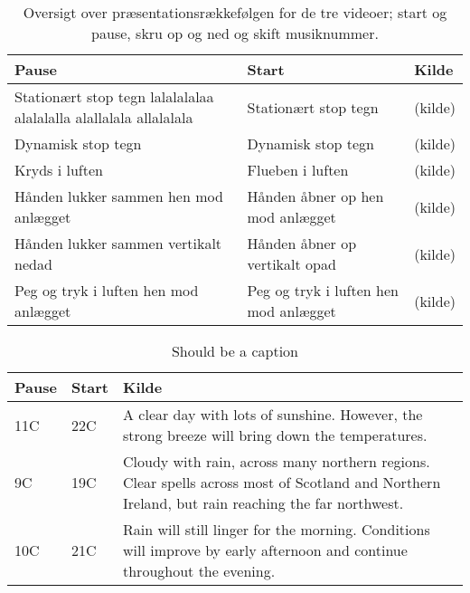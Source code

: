 \begin{table}[H]
	\centering
	\begin{tabular}{| p{4cm} | p{4cm} | p{4cm} |}
		\hline
		\textbf{Pause} & \textbf{Start} & \textbf{Kilde} \\ \hline
		Stationært stop tegn lalalalalaa alalalalla alallalala allalalala & Stationært stop tegn & (kilde)\\ \hline
		Dynamisk stop tegn  & Dynamisk stop tegn & (kilde) \\ \hline
		Kryds i luften & Flueben i luften & (kilde) \\ \hline
		Hånden lukker sammen hen mod anlægget & Hånden åbner op hen mod anlægget & (kilde)\\ \hline
		Hånden lukker sammen vertikalt nedad & Hånden åbner op vertikalt opad & (kilde) \\ \hline
		Peg og tryk i luften hen mod anlægget & Peg og tryk i luften hen mod anlægget & (kilde) \\ \hline
	\end{tabular}
	\caption{Oversigt over præsentationsrækkefølgen for de tre videoer; start og pause, skru op og ned og skift musiknummer.}
	\label{tab:IndsamledeGestikkerPause}
\end{table}
\noindent





\begin{table}[H]
\begin{center}
    \begin{tabular}{ | p{4cm} | p{4cm} | p{4cm} |}
    \hline
    \textbf{Pause} & \textbf{Start} & \textbf{Kilde} \\ \hline
    11C & 22C & A clear day with lots of sunshine.  
    However, the strong breeze will bring down the temperatures. \\ \hline
    9C & 19C & Cloudy with rain, across many northern regions. Clear spells 
    across most of Scotland and Northern Ireland, 
    but rain reaching the far northwest. \\ \hline
    10C & 21C & Rain will still linger for the morning. 
    Conditions will improve by early afternoon and continue 
    throughout the evening. \\ \hline
    \end{tabular}
     \caption {Should be a caption}
     \label{tab:}
\end{center}
\end{table}


